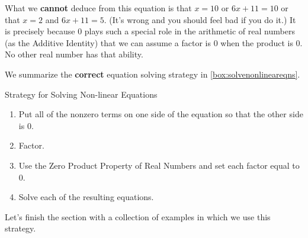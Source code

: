 What we \textbf{cannot} deduce from this equation is that $x = 10$ or $6x+11 = 10$ or that $x = 2$ and $6x+11 = 5$.  (It's wrong and you should feel bad if you do it.)  It is precisely because $0$ plays such a special role in the arithmetic of real numbers (as the Additive Identity) that we can assume a factor is $0$ when the product is $0$.  No other real number has that ability.

We summarize the {\bf correct} equation solving strategy in \autoref{box:solvenonlineareqns}.

\begin{floatbox}[label=box:solvenonlineareqns]{Strategy for Solving Non-linear Equations}

\begin{enumerate}[leftmargin=*]

\item  Put all of the nonzero terms on one side of the equation so that the other side is $0$.
\item  Factor.
\item  Use the Zero Product Property of Real Numbers and set each factor equal to $0$.
\item  Solve each of the resulting equations.

\end{enumerate}

\end{floatbox}

Let's finish the section with a collection of examples in which we use this strategy.

